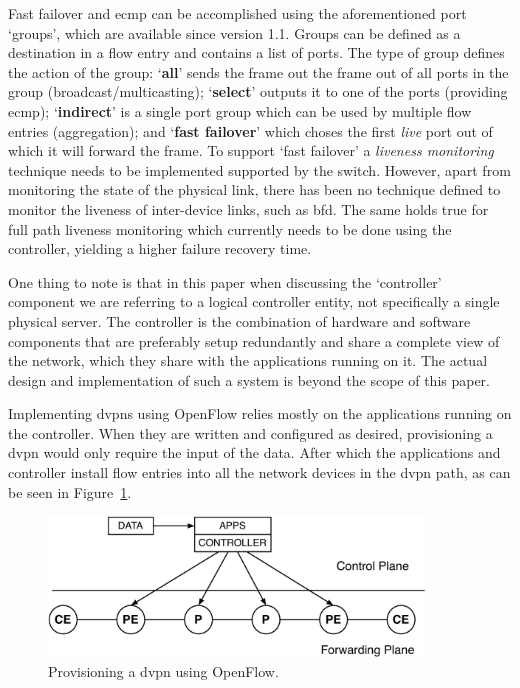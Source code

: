 Fast failover and \ac{ecmp} can be accomplished using the aforementioned port `groups', which are available since version 1.1. Groups can be defined as a destination in a flow entry and contains a list of ports. The type of group defines the action of the group: `\textbf{all}' sends the frame out the frame out of all ports in the group (broadcast/multicasting); `\textbf{select}' outputs it to one of the ports (providing \ac{ecmp}); `\textbf{indirect}' is a single port group which can be used by multiple flow entries (aggregation); and `\textbf{fast failover}' which choses the first \textsl{live} port out of which it will forward the frame. To support `fast failover' a \textsl{liveness monitoring} technique needs to be implemented supported by the switch. However, apart from monitoring the state of the physical link, there has been no technique defined to monitor the liveness of inter-device links, such as \ac{bfd}. The same holds true for full path liveness monitoring which currently needs to be done using the controller, yielding a higher failure recovery time.

One thing to note is that in this paper when discussing the `controller' component we are referring to a logical controller entity, not specifically a single physical server. The controller is the combination of hardware and software components that are preferably setup redundantly and share a complete view of the network, which they share with the applications running on it. The actual design and implementation of such a system is beyond the scope of this paper.

Implementing \acp{dvpn} using OpenFlow relies mostly on the applications running on the controller. When they are written and configured as desired, provisioning a \ac{dvpn} would only require the input of the data. After which the applications and controller install flow entries into all the network devices in the \ac{dvpn} path, as can be seen in Figure~\ref{fig:nms-stack-of}.

\begin{figure}[h]
	\centering
	\includegraphics[width=10cm]{./includes/nms-stack-of.pdf}
	\caption{Provisioning a \ac{dvpn} using OpenFlow.}
	\label{fig:nms-stack-of}
\end{figure}


